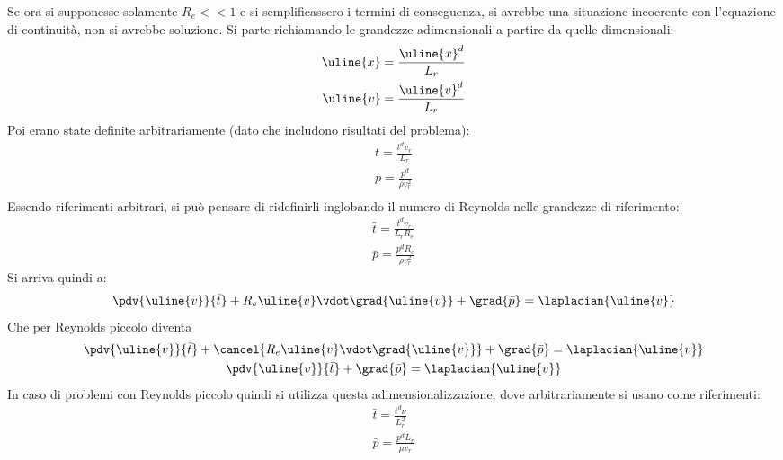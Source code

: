 Se ora si supponesse solamente $R_e << 1$ e si semplificassero i termini di conseguenza, si avrebbe una situazione incoerente con l'equazione di continuità, non si avrebbe soluzione.
Si parte richiamando le grandezze adimensionali a partire da quelle dimensionali:
	\begin{equation*}
		\begin{gathered}
			\uline{x} = \frac{\uline{x}^d}{L_r} \\
			\uline{v} = \frac{\uline{v}^d}{L_r}
		\end{gathered}
	\end{equation*} 
Poi erano state definite arbitrariamente (dato che includono risultati del problema):
%
	\begin{equation*}
		\begin{gathered}
			t = \frac{t^d v_r}{L_r}\\
			p = \frac{p^d}{\rho v^2_r}\\
		\end{gathered}
	\end{equation*} 
%
Essendo riferimenti arbitrari, si può pensare di ridefinirli inglobando il numero di Reynolds nelle grandezze di riferimento:
%
	\begin{equation*}
		\begin{gathered}
			\bar{t} = \frac{t^d v_r}{L_r R_e}\\
			\bar{p} = \frac{p^d R_e}{\rho v^2_r}
		\end{gathered}
	\end{equation*}
% 
Si arriva quindi a:
%
	\begin{equation*}
		\pdv{ \uline{v} }{ \bar{t} } + R_e \uline{v} \vdot \grad{\uline{v}} + \grad{\bar{p}} = \laplacian{\uline{v}}
	\end{equation*}
%
Che per Reynolds piccolo diventa
	\begin{equation*}
		\begin{gathered}
			\pdv{ \uline{v} }{ \bar{t} } + \cancel{ R_e \uline{v} \vdot \grad{\uline{v}} } + \grad{\bar{p}} = \laplacian{\uline{v}}\\
			\pdv{ \uline{v} }{ \bar{t} } + \grad{\bar{p}} = \laplacian{\uline{v}}
		\end{gathered}
	\end{equation*} 
%
In caso di problemi con Reynolds piccolo quindi si utilizza questa adimensionalizzazione, dove arbitrariamente si usano come riferimenti:
%
	\begin{equation*}
		\begin{gathered}
			\bar{t} = \frac{t^d \nu}{L^2_r} \\
			\bar{p} = \frac{p^d L_r}{\mu v_r}
		\end{gathered}
	\end{equation*} 
